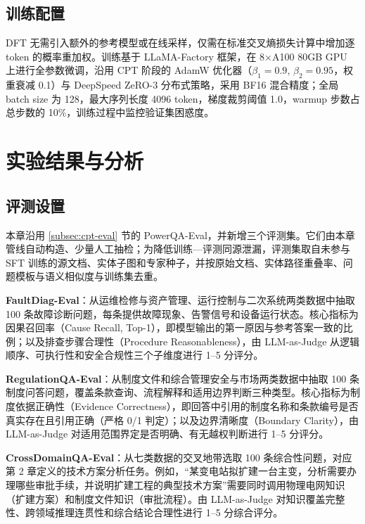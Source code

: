 \documentclass[fontset=fandol,type=master,campus=shenzhen,etitleauto=true]{hithesisbook}
\begin{document}
\subsection{训练配置}\label{subsec:sft-config}

DFT 无需引入额外的参考模型或在线采样，仅需在标准交叉熵损失计算中增加逐 token 的概率重加权。训练基于 LLaMA-Factory 框架，在 8×A100 80GB GPU 上进行全参数微调，沿用 CPT 阶段的 AdamW 优化器（$\beta_1 = 0.9$, $\beta_2 = 0.95$，权重衰减 0.1）与 DeepSpeed ZeRO-3 分布式策略\cite{ref68,ref69}，采用 BF16 混合精度；全局 batch size 为 128，最大序列长度 4096 token，梯度裁剪阈值 1.0，warmup 步数占总步数的 10\%，训练过程中监控验证集困惑度。

\section{实验结果与分析}\label{sft-ux8badux7ec3ux4e0eux5b9eux9a8cux7ed3ux679c}

\subsection{评测设置}\label{subsec:sft-eval}

本章沿用 \ref{subsec:cpt-eval} 节的 PowerQA-Eval，并新增三个评测集。它们由本章管线自动构造、少量人工抽检；为降低训练—评测同源泄漏，评测集取自未参与 SFT 训练的源文档、实体子图和专家种子，并按原始文档、实体路径重叠率、问题模板与语义相似度与训练集去重。

\textbf{FaultDiag-Eval}：从运维检修与资产管理、运行控制与二次系统两类数据中抽取 100 条故障诊断问题，每条提供故障现象、告警信号和设备运行状态。核心指标为因果召回率（Cause Recall, Top-1），即模型输出的第一原因与参考答案一致的比例；以及排查步骤合理性（Procedure Reasonableness），由 LLM-as-Judge 从逻辑顺序、可执行性和安全合规性三个子维度进行 1--5 分评分。

\textbf{RegulationQA-Eval}：从制度文件和综合管理安全与市场两类数据中抽取 100 条制度问答问题，覆盖条款查询、流程解释和适用边界判断三种类型。核心指标为制度依据正确性（Evidence Correctness），即回答中引用的制度名称和条款编号是否真实存在且引用正确（严格 0/1 判定）；以及边界清晰度（Boundary Clarity），由 LLM-as-Judge 对适用范围界定是否明确、有无越权判断进行 1--5 分评分。

\textbf{CrossDomainQA-Eval}：从七类数据的交叉地带选取 100 条综合性问题，对应第 2 章定义的技术方案分析任务。例如，“某变电站拟扩建一台主变，分析需要办理哪些审批手续，并说明扩建工程的典型技术方案”需要同时调用物理电网知识（扩建方案）和制度文件知识（审批流程）。由 LLM-as-Judge 对知识覆盖完整性、跨领域推理连贯性和综合结论合理性进行 1--5 分综合评分。
\end{document}
